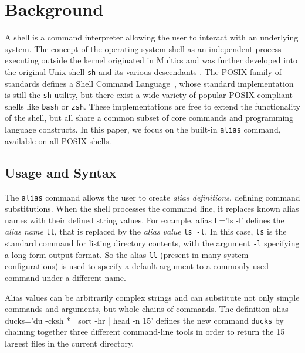 \documentclass[sigconf,nonacm,screen]{acmart}
\newenvironment{CVerbatim}
  {\center\BVerbatim}
  {\endBVerbatim\endcenter}
\newcommand{\cmd}[1]{{\texttt{#1}}}
\begin{document}
\section{Background}

A shell is a command interpreter allowing the user to interact with an underlying system.
The concept of the operating system shell as an independent process executing outside the kernel originated in Multics \citep{pouzin:65} and was further developed into the original Unix shell \texttt{sh} and its various descendants \citep{jones:11,seibold2020shell}.
The POSIX family of standards defines a Shell Command Language~\citep{posix_standard, greenberg:17}, whose standard implementation is still the \texttt{sh} utility, but there exist a wide variety of popular POSIX-compliant shells like \texttt{bash} or \texttt{zsh}.
These implementations are free to extend the functionality of the shell, but all share a common subset of core commands and programming language constructs.
In this paper, we focus on the built-in \texttt{alias} command, available on all POSIX shells.

\subsection{Usage and Syntax}

The \texttt{alias} command allows the user to create \emph{alias definitions}, defining command substitutions.
When the shell processes the command line, it replaces known alias names with their defined string values.
For example, 
\begin{CVerbatim}
alias ll='ls -l'
\end{CVerbatim}
defines the \emph{alias name} \texttt{ll}, that is replaced by the \emph{alias value} \texttt{ls -l}.
In this case, \cmd{ls} is the standard command for listing directory contents, with the argument \texttt{-l} specifying a long-form output format.
So the alias \texttt{ll} (present in many system configurations) is used to specify a default argument to a commonly used command under a different name.

Alias values can be arbitrarily complex strings and can substitute not only simple commands and arguments, but whole chains of commands. 
The definition
\begin{CVerbatim}
alias ducks='du -cksh * | sort -hr | head -n 15'
\end{CVerbatim}
defines the new command \cmd{ducks} by chaining together three different command-line tools in order to return the 15 largest files in the current directory.
\end{document}
